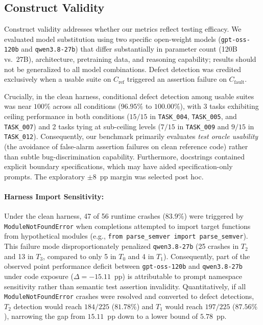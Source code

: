 \documentclass[11pt,a4paper]{article}
\begin{document}
\subsection{Construct Validity}
Construct validity addresses whether our metrics reflect testing efficacy. We evaluated model substitution using two specific open-weight models (\texttt{gpt-oss-120b} and \texttt{qwen3.8-27b}) that differ substantially in parameter count (120B vs.\ 27B), architecture, pretraining data, and reasoning capability; results should not be generalized to all model combinations. Defect detection was credited exclusively when a usable suite on $C_{\text{ref}}$ triggered an assertion failure on $C_{\text{fault}}$. 

Crucially, in the clean harness, conditional defect detection among usable suites was near $100\%$ across all conditions ($96.95\%$ to $100.00\%$), with 3 tasks exhibiting ceiling performance in both conditions ($15/15$ in \texttt{TASK\_004}, \texttt{TASK\_005}, and \texttt{TASK\_007}) and 2 tasks tying at sub-ceiling levels ($7/15$ in \texttt{TASK\_009} and $9/15$ in \texttt{TASK\_012}). Consequently, our benchmark primarily evaluates \textit{test oracle usability} (the avoidance of false-alarm assertion failures on clean reference code) rather than subtle bug-discrimination capability. Furthermore, docstrings contained explicit boundary specifications, which may have aided specification-only prompts. The exploratory $\pm 8$~pp margin was selected post hoc.

\paragraph{Harness Import Sensitivity:}
Under the clean harness, 47 of 56 runtime crashes ($83.9\%$) were triggered by \texttt{ModuleNotFoundError} when completions attempted to import target functions from hypothetical modules (e.g., \texttt{from parse\_semver import parse\_semver}). This failure mode disproportionately penalized \texttt{qwen3.8-27b} (25 crashes in $T_2$ and 13 in $T_3$, compared to only 5 in $T_0$ and 4 in $T_1$). Consequently, part of the observed point performance deficit between \texttt{gpt-oss-120b} and \texttt{qwen3.8-27b} under code exposure ($\Delta = -15.11$~pp) is attributable to prompt namespace sensitivity rather than semantic test assertion invalidity. Quantitatively, if all \texttt{ModuleNotFoundError} crashes were resolved and converted to defect detections, $T_2$ detection would reach $184/225$ ($81.78\%$) and $T_1$ would reach $197/225$ ($87.56\%$), narrowing the gap from $15.11$~pp down to a lower bound of $5.78$~pp.
\end{document}

